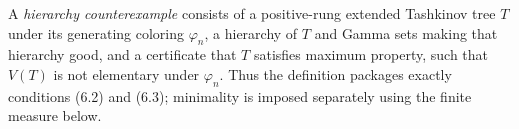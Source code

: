\begin{definition}
A \emph{hierarchy counterexample} consists of a positive-rung extended
Tashkinov tree $T$ under its generating coloring $\varphi_n$, a hierarchy
of $T$ and Gamma sets making that hierarchy good, and a certificate that
$T$ satisfies maximum property, such that $V(T)$ is not elementary under
$\varphi_n$.  Thus the definition packages exactly conditions (6.2) and
(6.3); minimality is imposed separately using the finite measure below.
\end{definition}

